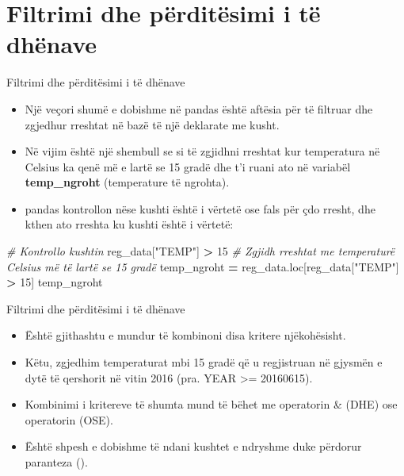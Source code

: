 \documentclass[
  ignorenonframetext,
]{beamer}
\newenvironment{Shaded}{\begin{snugshade}}{\end{snugshade}}
\newcommand{\CommentTok}[1]{\textcolor[rgb]{0.56,0.35,0.01}{\textit{#1}}}
\newcommand{\DecValTok}[1]{\textcolor[rgb]{0.00,0.00,0.81}{#1}}
\newcommand{\NormalTok}[1]{#1}
\newcommand{\OperatorTok}[1]{\textcolor[rgb]{0.81,0.36,0.00}{\textbf{#1}}}
\newcommand{\StringTok}[1]{\textcolor[rgb]{0.31,0.60,0.02}{#1}}
\begin{document}
\hypertarget{filtrimi-dhe-puxebrdituxebsimi-i-tuxeb-dhuxebnave}{%
\section{Filtrimi dhe përditësimi i të
dhënave}\label{filtrimi-dhe-puxebrdituxebsimi-i-tuxeb-dhuxebnave}}

\begin{frame}[fragile]{Filtrimi dhe përditësimi i të dhënave}
\protect\hypertarget{filtrimi-dhe-puxebrdituxebsimi-i-tuxeb-dhuxebnave-1}{}
\begin{itemize}
\item
  Një veçori shumë e dobishme në pandas është aftësia për të filtruar
  dhe zgjedhur rreshtat në bazë të një deklarate me kusht.
\item
  Në vijim është një shembull se si të zgjidhni rreshtat kur temperatura
  në Celsius ka qenë më e lartë se 15 gradë dhe t'i ruani ato në
  variabël \textbf{temp\_ngroht} (temperature të ngrohta).
\item
  pandas kontrollon nëse kushti është i vërtetë ose fals për çdo rresht,
  dhe kthen ato rreshta ku kushti është i vërtetë:
\end{itemize}

\begin{Shaded}
\begin{Highlighting}[]
\CommentTok{\# Kontrollo kushtin}
\NormalTok{reg\_data[}\StringTok{"TEMP"}\NormalTok{] }\OperatorTok{\textgreater{}} \DecValTok{15}
\CommentTok{\# Zgjidh rreshtat me temperaturë Celsius më të lartë se 15 gradë}
\NormalTok{temp\_ngroht }\OperatorTok{=}\NormalTok{ reg\_data.loc[reg\_data[}\StringTok{"TEMP"}\NormalTok{] }\OperatorTok{\textgreater{}} \DecValTok{15}\NormalTok{]}
\NormalTok{temp\_ngroht}
\end{Highlighting}
\end{Shaded}
\end{frame}

\begin{frame}{Filtrimi dhe përditësimi i të dhënave}
\protect\hypertarget{filtrimi-dhe-puxebrdituxebsimi-i-tuxeb-dhuxebnave-2}{}
\begin{itemize}
\item
  Është gjithashtu e mundur të kombinoni disa kritere njëkohësisht.
\item
  Këtu, zgjedhim temperaturat mbi 15 gradë që u regjistruan në gjysmën e
  dytë të qershorit në vitin 2016 (pra. YEAR \textgreater= 20160615).
\item
  Kombinimi i kritereve të shumta mund të bëhet me operatorin \& (DHE)
  ose operatorin \textbar{} (OSE).
\item
  Është shpesh e dobishme të ndani kushtet e ndryshme duke përdorur
  paranteza ().
\end{itemize}
\end{frame}
\end{document}
